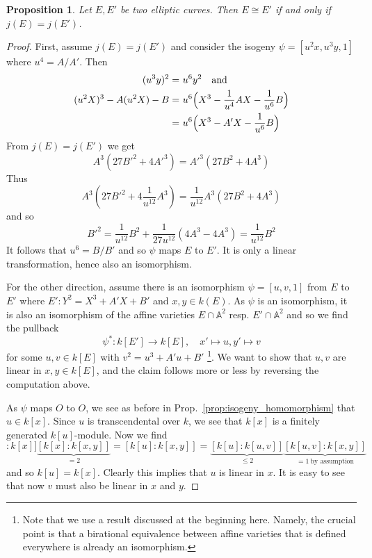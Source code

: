 \documentclass{scrartcl}
\renewcommand{\O}{O}
\newtheorem{prop}{Proposition}[section]
\theoremstyle{definition}
\begin{document}
\begin{prop}
    Let $E, E'$ be two elliptic curves. Then $E \cong E'$ if and only if $j(E) = j(E')$.
\end{prop}
\begin{proof}
    First, assume $j(E) = j(E')$ and consider the isogeny $\psi = [u^2 x, u^3 y, 1]$ where $u^4 = A/A'$.
    Then
    \begin{align*}
        (u^3 y)^2 =& \ u^6 y^2 \quad \text{and} \\
        (u^2 X)^3 - A (u^2 X) - B =& \ u^6 \Bigl(X^3 - \frac 1 {u^4} A X - \frac 1 {u^6} B \Bigr) \\
        =& \ u^6 \Bigl( X^3 - A' X - \frac 1 {u^6} B \Bigr)
    \end{align*}
    From $j(E) = j(E')$ we get
    \begin{equation*}
        A^3 (27 B'^2 + 4A'^3) = A'^3 (27 B^2 + 4A^3)
    \end{equation*}
    Thus
    \begin{equation*}
        A^3 \left( 27 B'^2 + 4\frac 1 {u^{12}} A^3 \right) = \frac 1 {u^{12}} A^3 (27 B^2 + 4A^3)
    \end{equation*}
    and so
    \begin{equation*}
        B'^2 = \frac 1 {u^{12}} B^2 + \frac 1 {27 u^{12}} (4 A^3 - 4 A^3) = \frac 1 {u^{12}} B^2
    \end{equation*}
    It follows that $u^6 = B/B'$ and so $\psi$ maps $E$ to $E'$. 
    It is only a linear transformation, hence also an isomorphism.

    For the other direction, assume there is an isomorphism $\psi = [u, v, 1]$ from $E$ to $E'$ where $E': Y^2 = X^3 + A'X + B'$ and $x, y \in k(E)$.
    As $\psi$ is an isomorphism, it is also an isomorphism of the affine varieties $E \cap \mathbb{A}^2$ resp. $E' \cap \mathbb{A}^2$ and so we find the pullback
    \begin{equation*}
        \psi^*: k[E'] \to k[E], \quad x' \mapsto u, y' \mapsto v
    \end{equation*}
    for some $u, v \in k[E]$ with $v^2 = u^3 + A'u + B'$
    \footnote{Note that we use a result discussed at the beginning here.
    Namely, the crucial point is that a birational equivalence between affine varieties that is defined everywhere is already an isomorphism.}.
    We want to show that $u, v$ are linear in $x, y \in k[E]$, and the claim follows more or less by reversing the computation above.

    As $\psi$ maps $\O$ to $\O$, we see as before in Prop.~\ref{prop:isogeny_homomorphism} that $u \in k[x]$.
    Since $u$ is transcendental over $k$, we see that $k[x]$ is a finitely generated $k[u]$-module.
    Now we find
    \begin{equation*}
        [k[u] : k[x]] \underbrace{[k[x] : k[x, y]]}_{= 2} = [k[u] : k[x, y]] = \underbrace{[k[u] : k[u, v]]}_{\leq 2} \underbrace{[k[u, v] : k[x, y]]}_{= 1 \ \text{by assumption}}
    \end{equation*}
    and so $k[u] = k[x]$.
    Clearly this implies that $u$ is linear in $x$.
    It is easy to see that now $v$ must also be linear in $x$ and $y$.
\end{proof}
\end{document}
